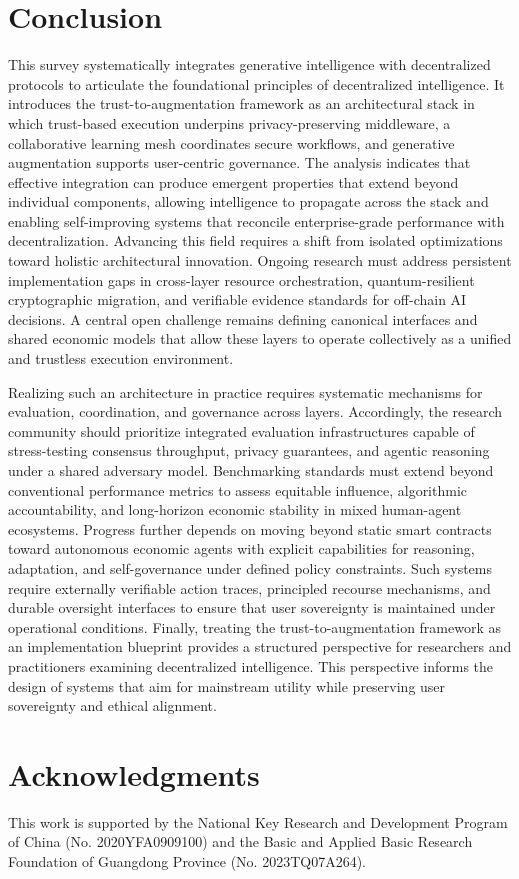 \documentclass[5p,twocolumn]{elsarticle}
\begin{document}
\section{Conclusion} \label{sec:end}
This survey systematically integrates generative intelligence with decentralized protocols to articulate the foundational principles of decentralized intelligence. It introduces the trust-to-augmentation framework as an architectural stack in which trust-based execution underpins privacy-preserving middleware, a collaborative learning mesh coordinates secure workflows, and generative augmentation supports user-centric governance. The analysis indicates that effective integration can produce emergent properties that extend beyond individual components, allowing intelligence to propagate across the stack and enabling self-improving systems that reconcile enterprise-grade performance with decentralization. Advancing this field requires a shift from isolated optimizations toward holistic architectural innovation. Ongoing research must address persistent implementation gaps in cross-layer resource orchestration, quantum-resilient cryptographic migration, and verifiable evidence standards for off-chain AI decisions. A central open challenge remains defining canonical interfaces and shared economic models that allow these layers to operate collectively as a unified and trustless execution environment.

Realizing such an architecture in practice requires systematic mechanisms for evaluation, coordination, and governance across layers. Accordingly, the research community should prioritize integrated evaluation infrastructures capable of stress-testing consensus throughput, privacy guarantees, and agentic reasoning under a shared adversary model. Benchmarking standards must extend beyond conventional performance metrics to assess equitable influence, algorithmic accountability, and long-horizon economic stability in mixed human-agent ecosystems. Progress further depends on moving beyond static smart contracts toward autonomous economic agents with explicit capabilities for reasoning, adaptation, and self-governance under defined policy constraints. Such systems require externally verifiable action traces, principled recourse mechanisms, and durable oversight interfaces to ensure that user sovereignty is maintained under operational conditions. Finally, treating the trust-to-augmentation framework as an implementation blueprint provides a structured perspective for researchers and practitioners examining decentralized intelligence. This perspective informs the design of systems that aim for mainstream utility while preserving user sovereignty and ethical alignment.


\section*{Acknowledgments}
This work is supported by the National Key Research and Development Program of China (No. 2020YFA0909100) and the Basic and Applied Basic Research Foundation of Guangdong Province (No. 2023TQ07A264).


 
\end{document}
